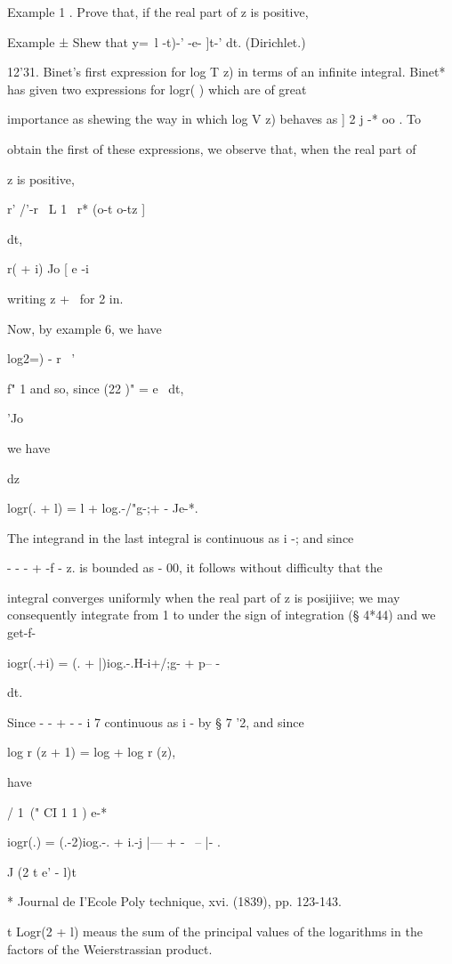 %
%

Example 1 . Prove that, if the real part of z is positive,

Example ± Shew that y=\ l -t)-' -e- ]t-' dt. (Dirichlet.)

12'31. Binet's first expression for log T z) in terms of an infinite
integral. Binet* has given two expressions for logr( ) which are of
great

importance as shewing the way in which log V z) behaves as ] 2 j -* oo
. To

obtain the first of these expressions, we observe that, when the real
part of

z is positive,

r' /'-r \ L 1 \ r* (o-t o-tz ]

dt,

r( + i) Jo [ e -i

writing z + \ for 2 in.

Now, by example 6, we have

log2=) - r~ '

f" 1 and so, since (22 )" = e~ dt,

'Jo

we have

dz

logr(. + l) = l + log.-/"g-;+ - Je-*.

The integrand in the last integral is continuous as i -; and since

- - - + -f - z. is bounded as - 00, it follows without difficulty
that the

integral converges uniformly when the real part of z is posijiive; we
may consequently integrate from 1 to under the sign of integration (§
4*44) and we get-f-

iogr(.+i) = (. + |)iog.-.H-i+/;g- + p-- -

dt.

Since - - + - - i 7 continuous as i - by § 7 '2, and since

log r (z + 1) = log + log r (z),

have

/ 1\ (" CI 1 1 ) e-*

iogr(.) = (.-2)iog.-. + i.-j |--- + - \ -- |- .

J (2 t e' - l)t

* Journal de I'Ecole Poly technique, xvi. (1839), pp. 123-143.

t Logr(2 + l) meaus the sum of the principal values of the logarithms
in the factors of the Weierstrassian product.

